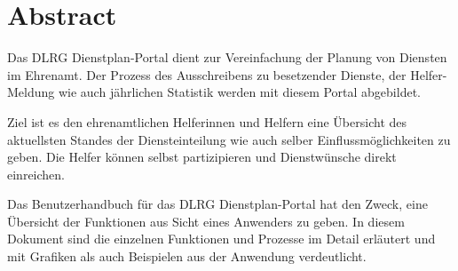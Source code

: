 \chapter*{Abstract} %

Das DLRG Dienstplan-Portal dient zur Vereinfachung der Planung von Diensten im Ehrenamt. Der Prozess des Ausschreibens zu besetzender Dienste, der Helfer-Meldung wie auch jährlichen Statistik werden mit diesem Portal abgebildet.

\vspace*{5mm} \noindent Ziel ist es den ehrenamtlichen Helferinnen und Helfern eine Übersicht des aktuellsten Standes der Diensteinteilung wie auch selber Einflussmöglichkeiten zu geben. Die Helfer können selbst  partizipieren und Dienstwünsche direkt einreichen. 

\vspace*{5mm} \noindent Das Benutzerhandbuch für das DLRG Dienstplan-Portal hat den Zweck, eine Übersicht der Funktionen aus Sicht eines Anwenders zu geben. In diesem Dokument sind die einzelnen Funktionen und Prozesse im Detail erläutert und mit Grafiken als auch Beispielen aus der Anwendung verdeutlicht.